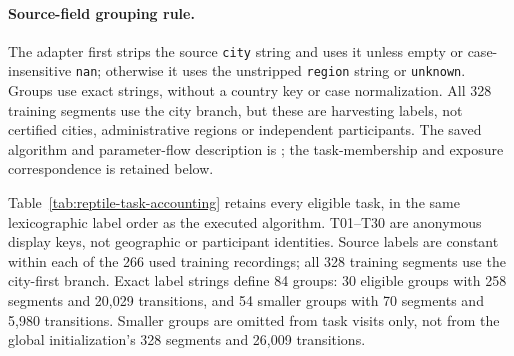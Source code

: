 \documentclass[11pt]{article}
\begin{document}
\paragraph{Source-field grouping rule.}
The adapter first strips the source \texttt{city} string and uses it unless
empty or case-insensitive \texttt{nan}; otherwise it uses the unstripped
\texttt{region} string or \texttt{unknown}. Groups use exact strings, without
a country key or case normalization. All 328 training segments use the city
branch, but these are harvesting labels, not certified cities, administrative
regions or independent participants.
The saved algorithm and parameter-flow description is
; the task-membership
and exposure correspondence is retained below.

Table~\ref{tab:reptile-task-accounting} retains every eligible task, in the
same lexicographic label order as the executed algorithm. T01--T30 are
anonymous display keys, not geographic or participant identities.
Source labels are constant within each of the 266 used training recordings;
all 328 training segments use the city-first branch. Exact label strings
define 84 groups: 30 eligible groups with 258 segments and 20,029 transitions,
and 54 smaller groups with 70 segments and 5,980 transitions.
Smaller groups are omitted from task visits only, not from the global
initialization's 328 segments and 26,009 transitions.
\end{document}
